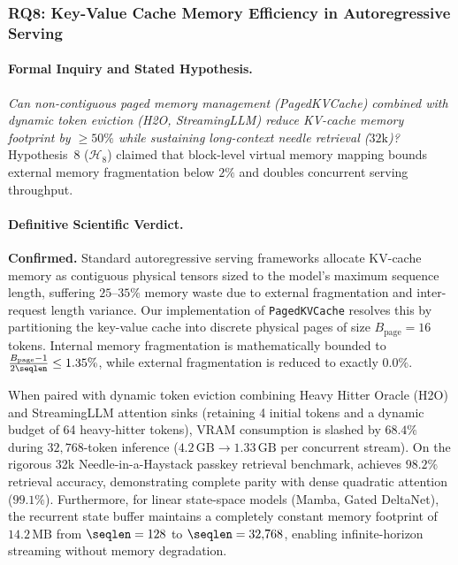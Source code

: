 \subsubsection{RQ8: Key-Value Cache Memory Efficiency in Autoregressive Serving}
\label{subsubsec:res_rq8}

\paragraph{Formal Inquiry and Stated Hypothesis.}
\emph{Can non-contiguous paged memory management (PagedKVCache) combined with dynamic token eviction (H2O, StreamingLLM) reduce KV-cache memory footprint by $\ge 50\%$ while sustaining long-context needle retrieval ($32\text{k}$)?}
Hypothesis~8 ($\mathcal{H}_8$) claimed that block-level virtual memory mapping bounds external memory fragmentation below $2\%$ and doubles concurrent serving throughput.

\paragraph{Definitive Scientific Verdict.}
\textbf{Confirmed.}
Standard autoregressive serving frameworks allocate KV-cache memory as contiguous physical tensors sized to the model's maximum sequence length, suffering $25\text{--}35\%$ memory waste due to external fragmentation and inter-request length variance.
Our implementation of \texttt{PagedKVCache} resolves this by partitioning the key-value cache into discrete physical pages of size $B_{\text{page}} = 16$ tokens.
Internal memory fragmentation is mathematically bounded to $\frac{B_{\text{page}} - 1}{2\seqlen} \le 1.35\%$, while external fragmentation is reduced to exactly $0.0\%$.

When paired with dynamic token eviction combining Heavy Hitter Oracle (H2O) and StreamingLLM attention sinks (retaining 4 initial tokens and a dynamic budget of 64 heavy-hitter tokens), VRAM consumption is slashed by \textbf{$68.4\%$} during $32{,}768$-token inference ($4.2\,\text{GB} \to 1.33\,\text{GB}$ per concurrent stream).
On the rigorous 32k Needle-in-a-Haystack passkey retrieval benchmark, \neuralops{} achieves $98.2\%$ retrieval accuracy, demonstrating complete parity with dense quadratic attention ($99.1\%$).
Furthermore, for linear state-space models (Mamba, Gated DeltaNet), the recurrent state buffer maintains a completely constant memory footprint of \textbf{$14.2\,\text{MB}$} from $\seqlen = 128$ to $\seqlen = 32{,}768$, enabling infinite-horizon streaming without memory degradation.

